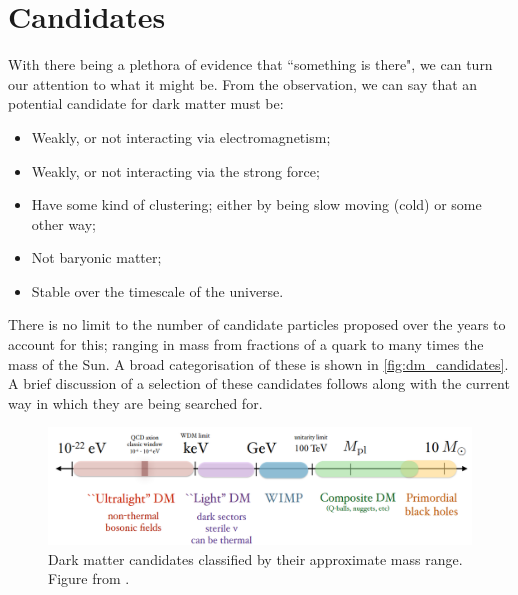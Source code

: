 \section{Candidates}
\par
With there being a plethora of evidence that ``something is there", we can turn our attention to what it might be.
From the observation, we can say that an potential candidate for dark matter must be:
\begin{itemize}
    \item Weakly, or not interacting via electromagnetism;
    \item Weakly, or not interacting via the strong force;
    \item Have some kind of clustering; either by being slow moving (cold) or some other way;
    \item Not baryonic matter;
    \item Stable over the timescale of the universe.
\end{itemize}
There is no limit to the number of candidate particles proposed over the years to account for this; ranging in mass from fractions of a quark to many times the mass of the Sun.
A broad categorisation of these is shown in \autoref{fig:dm_candidates}.
A brief discussion of a selection of these candidates follows along with the current way in which they are being searched for.
\begin{figure}[!h]
    \centering
    \includegraphics[width=15cm]{Figures/DarkMatterEvidence/dark_matter_candidates.png}
    \caption{Dark matter candidates classified by their approximate mass range. Figure from \cite{dm_figure_candidates_ref}.}
    \label{fig:dm_candidates}
\end{figure}


